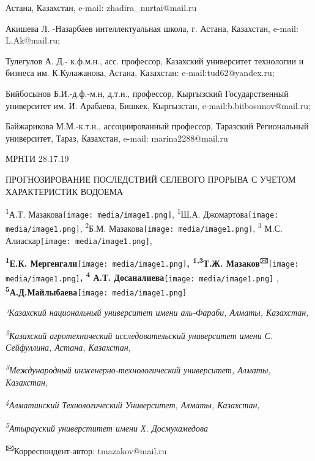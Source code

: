 \documentclass[
]{article}
\begin{document}
Астана, Казахстан, e-mail: zhadira\_nurtai@mail.ru

Акишева Л. -Назарбаев интеллектуальная школа, г. Астана, Казахстан,
e-mail: L.Ak@mail.ru;

Тулегулов А. Д.- к.ф.м.н., асс. профессор, Казахский университет
технологии и бизнеса им. К.Кулажанова, Астана, Казахстан:
e-mail:tud62@yandex.ru;

Бийбосынов Б.И.-д.ф.-м.н, д.т.н., профессор, Кыргызский Государственный
университет им. И. Арабаева, Бишкек, Кыргызстан,
e-mail:b.biibosunov@mail.ru;

Байжарикова М.М.-к.т.н., ассоциированный профессор, Таразский
Региональный университет, Тараз, Казахстан, e-mail: marina2288@mail.ru

МРНТИ 28.17.19

ПРОГНОЗИРОВАНИЕ ПОСЛЕДСТВИЙ СЕЛЕВОГО ПРОРЫВА С УЧЕТОМ ХАРАКТЕРИСТИК
ВОДОЕМА

\textsuperscript{1}А.Т.
Мазакова\texttt{[image: media/image1.png]},
\textsuperscript{1}Ш.А.
Джомартова\texttt{[image: media/image1.png]},
\textsuperscript{2}Б.М.
Мазакова\texttt{[image: media/image1.png]},
\textsuperscript{3} М.С.
Алиаскар\texttt{[image: media/image1.png]},

\textbf{\textsuperscript{1}Е.К.
Мергенгали}\texttt{[image: media/image1.png]}\textbf{,
\textsuperscript{1,3}Т.Ж.
Мазаков\textsuperscript{🖂}}\texttt{[image: media/image1.png]}\textbf{,
\textsuperscript{4} А.Т.
Досаналиева}\texttt{[image: media/image1.png]}
,
\textbf{\textsuperscript{5}А.Д.Майлыбаева}\texttt{[image: media/image1.png]}

\emph{¹Казахский национальный университет имени аль-Фараби, Алматы,
Казахстан,}

\emph{\textsuperscript{2}Казахский агротехнический исследовательский
университет имени С. Сейфуллина, Астана, Казахстан,}

\emph{\textsuperscript{3}Международный инженерно-технологический
университет, Алматы, Казахстан,}

\emph{\textsuperscript{4}Алматинский Технологический Университет,
Алматы, Казахстан,}

\emph{\textsuperscript{5}Атырауский универститет имени Х. Досмухамедова}

\textbf{\textsuperscript{🖂}}Корреспондент-автор: tmazakov@mail.ru
\end{document}
